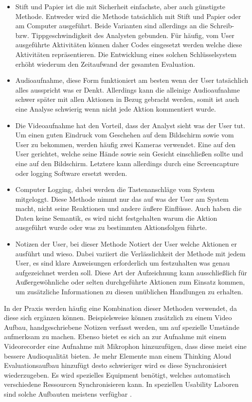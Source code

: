 \documentclass[draft=false
              ,paper=a4
              ,twoside=false
              ,fontsize=11pt
              ,headsepline
              ,BCOR10mm
              ,DIV11
              ]{scrbook}
\begin{document}
\begin{itemize}
  \item Stift und Papier ist die mit Sicherheit einfachste, aber auch günstigste Methode. Entweder wird die Methode tatsächlich mit Stift und Papier oder am Computer ausgeführt. Beide Varianten sind allerdings an die Schreib- bzw. Tippgeschwindigkeit des Analysten gebunden. Für häufig, vom User ausgeführte Aktivitäten können daher Codes eingesetzt werden welche diese Aktivitäten repräsentieren. Die Entwicklung eines solchen Schlüsselsystem erhöht wiederum den Zeitaufwand der gesamten Evaluation.
  \item Audioaufnahme, diese Form funktioniert am besten wenn der User tatsächlich alles ausspricht was er Denkt. Allerdings kann die alleinige Audioaufnahme schwer später mit allen Aktionen in Bezug gebracht werden, somit ist auch eine Analyse schwierig wenn nicht jede Aktion kommentiert wurde.
  \item Die Videoaufnahme hat den Vorteil, dass der Analyst sieht was der User tut. Um einen guten Eindruck vom Geschehen auf dem Bildschirm sowie vom User zu bekommen, werden häufig zwei Kameras verwendet. Eine auf den User gerichtet, welche seine Hände sowie sein Gesicht einschließen sollte und eine auf den Bildschirm. Letztere kann allerdings durch eine Screencapture oder logging Software ersetzt werden. 
  \item Computer Logging, dabei werden die Tastenanschläge vom System mitgeloggt. Diese Methode nimmt nur das auf was der User am System macht, nicht seine Reaktionen und andere äußere Einflüsse. Auch haben die Daten keine Semantik, es wird nicht festgehalten warum die Aktion ausgeführt wurde oder was zu bestimmten Aktionsfolgen führte. 
  \item Notizen der User, bei dieser Methode Notiert der User welche Aktionen er ausführt und wieso. Dabei variiert die Verlässlichkeit der Methode mit jedem User, es sind klare Anweisungen erforderlich um festzuhalten was genau aufgezeichnet werden soll. Diese Art der Aufzeichnung kann ausschließlich für Außergewöhnliche oder selten durchgeführte Aktionen zum Einsatz kommen, um zusätzliche Informationen zu diesen unüblichen Handlungen zu erhalten.
\end{itemize}

In der Praxis werden häufig eine Kombination dieser Methoden verwendet, da diese sich ergänzen können. Beispielsweise können zusätzlich zu einem Video Aufbau, handgeschriebene Notizen verfasst werden, um auf spezielle Umstände aufmerksam zu machen. Ebenso bietet es sich an zur Aufnahme mit einem Videorecorder eine Aufnahme mit Mikrophon hinzuzufügen, dass diese meist eine bessere Audioqualität bieten. Je mehr Elemente man einem Thinking Aloud Evaluationsaufbau hinzufügt desto schwieriger wird es diese Synchronisiert wiederzugeben. Es wird spezielles Equipment benötigt, welches automatisch verschiedene Ressourcen Synchronisieren kann. In speziellen Usability Laboren sind solche Aufbauten meistens verfügbar \cite{nielsen_usability_1994}.
\end{document}
